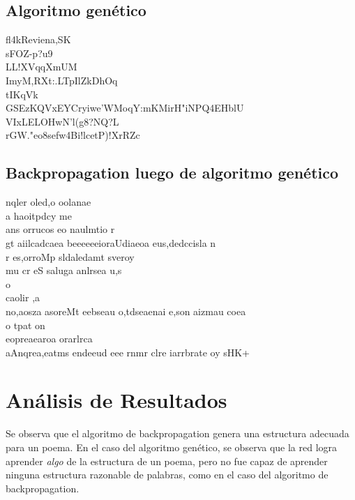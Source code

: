 \documentclass[11pt,letterpaper]{article}
\begin{document}
\subsection{Algoritmo genético}
\begin{center}
\parbox{0.5\linewidth} {
fl4kReviena,SK\\
sFOZ-p?u9\\

LL!XVqqXmUM\\
ImyM,RXt:.LTpIlZkDhOq\\
tIKqVk\\
GSEzKQVxEYCryiwe'WMoqY:mKMirH"iNPQ4EHblU\\
VIxLELOHwN'l(g8?NQ?L\\
rGW."eo8sefw4Bi!lcetP)!XrRZc\\
}
\end{center}

\subsection{Backpropagation luego de algoritmo genético}
\begin{center}
\parbox{0.5\linewidth} {
nqler oled,o oolanae\\
 a haoitpdcy me\\
ans orrucos eo naulmtio r\\

gt aiilcadcaea beeeeeeioraUdiaeoa eus,dedccisla n\\
r es,orroMp  sldaledamt sveroy\\

mu cr eS saluga anlrsea u,s\\
o\\
caolir ,a\\
no,aosza asoreMt  eebseau o,tdseaenai e,son aizmau coea\\
o  tpat  on\\
eopreaearoa orarlrca\\
aAnqrea,eatms endeeud eee rnmr clre  iarrbrate oy sHK+
}
\end{center}

\section{Análisis de Resultados}
Se observa que el algoritmo de backpropagation genera una estructura adecuada para un poema. En 
el caso del algoritmo genético, se observa que la red logra aprender \textit{algo} de la estructura 
de un poema, pero no fue capaz de aprender ninguna estructura razonable de palabras, como en el caso 
del algoritmo de backpropagation.\\
\end{document}
